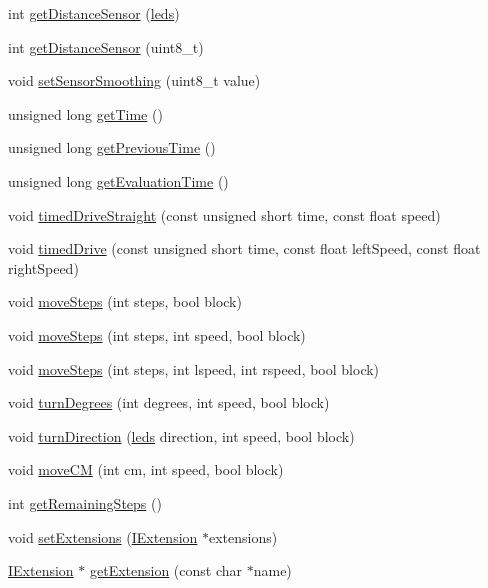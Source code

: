 \begin{DoxyCompactItemize}
\item 
int \hyperlink{class_chirp_aed1f66f8d46abb43bfea329aea6e255c}{get\-Distance\-Sensor} (\hyperlink{_chirp_8h_a840c9267db46ce0db0f44d473c562e66}{leds})
\item 
int \hyperlink{class_chirp_ada66e5df1a5320b1c59ff64ecba07464}{get\-Distance\-Sensor} (uint8\-\_\-t)
\item 
void \hyperlink{class_chirp_a45de71fb95e82c75594b8ba481fe2ae6}{set\-Sensor\-Smoothing} (uint8\-\_\-t value)
\item 
unsigned long \hyperlink{class_chirp_ae7a13df4a1c4e5c223eec85dd88398e4}{get\-Time} ()
\item 
unsigned long \hyperlink{class_chirp_a69b2fe02e1967fe7fe0a95670b19aa37}{get\-Previous\-Time} ()
\item 
unsigned long \hyperlink{class_chirp_a0edf7b385e50774425effaf40daf68d5}{get\-Evaluation\-Time} ()
\item 
void \hyperlink{class_chirp_a3a01d0ab696a841c19e665c3e3ca193b}{timed\-Drive\-Straight} (const unsigned short time, const float speed)
\item 
void \hyperlink{class_chirp_addfefd68ed3915ae33008497076c6679}{timed\-Drive} (const unsigned short time, const float left\-Speed, const float right\-Speed)
\item 
void \hyperlink{class_chirp_a7e74252a548429685f4d88bc5bde8b10}{move\-Steps} (int steps, bool block)
\item 
void \hyperlink{class_chirp_a1ce38598a9410c0740ec1d3be1354f3a}{move\-Steps} (int steps, int speed, bool block)
\item 
void \hyperlink{class_chirp_ab21f910e6b523761530c728bb4a3aeef}{move\-Steps} (int steps, int lspeed, int rspeed, bool block)
\item 
void \hyperlink{class_chirp_a3f16fbc353cea4e9d9475e5581e4bd74}{turn\-Degrees} (int degrees, int speed, bool block)
\item 
void \hyperlink{class_chirp_ae9a536d71f0a366cdc0e5947e8b89573}{turn\-Direction} (\hyperlink{_chirp_8h_a840c9267db46ce0db0f44d473c562e66}{leds} direction, int speed, bool block)
\item 
void \hyperlink{class_chirp_a80c9049b4787a1bc7b18d7e0242eeabe}{move\-C\-M} (int cm, int speed, bool block)
\item 
int \hyperlink{class_chirp_af072be9037b395acc1319032c294a5ef}{get\-Remaining\-Steps} ()
\item 
void \hyperlink{class_chirp_ac8a7985ea321ff91fa088019bf4ff220}{set\-Extensions} (\hyperlink{class_i_extension}{I\-Extension} $\ast$extensions)
\item 
\hyperlink{class_i_extension}{I\-Extension} $\ast$ \hyperlink{class_chirp_a7b374106975567aa7f222abfd530dd33}{get\-Extension} (const char $\ast$name)
\end{DoxyCompactItemize}



